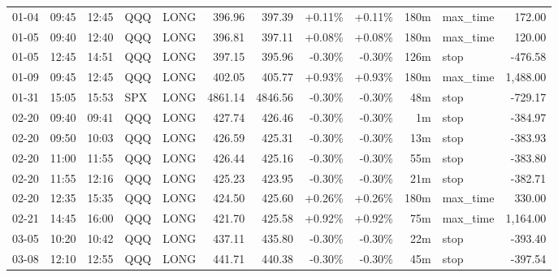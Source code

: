\documentclass[11pt,a4paper]{article}
\begin{document}
\begin{center}
\begin{longtable}{>{\color{txtmain}}l l l l l r r r r r >{\color{txtmain}}l r}
01-04 & 09:45 & 12:45 & QQQ & LONG & 396.96 & 397.39 & \textcolor{wingreen}{+0.11\%} & \textcolor{wingreen}{+0.11\%} & 180m & max\_time & \textcolor{wingreen}{172.00} \\
01-05 & 09:40 & 12:40 & QQQ & LONG & 396.81 & 397.11 & \textcolor{wingreen}{+0.08\%} & \textcolor{wingreen}{+0.08\%} & 180m & max\_time & \textcolor{wingreen}{120.00} \\
01-05 & 12:45 & 14:51 & QQQ & LONG & 397.15 & 395.96 & \textcolor{lossred}{-0.30\%} & \textcolor{lossred}{-0.30\%} & 126m & stop & \textcolor{lossred}{-476.58} \\
01-09 & 09:45 & 12:45 & QQQ & LONG & 402.05 & 405.77 & \textcolor{wingreen}{+0.93\%} & \textcolor{wingreen}{+0.93\%} & 180m & max\_time & \textcolor{wingreen}{1,488.00} \\
01-31 & 15:05 & 15:53 & SPX & LONG & 4861.14 & 4846.56 & \textcolor{lossred}{-0.30\%} & \textcolor{lossred}{-0.30\%} & 48m & stop & \textcolor{lossred}{-729.17} \\
02-20 & 09:40 & 09:41 & QQQ & LONG & 427.74 & 426.46 & \textcolor{lossred}{-0.30\%} & \textcolor{lossred}{-0.30\%} & 1m & stop & \textcolor{lossred}{-384.97} \\
02-20 & 09:50 & 10:03 & QQQ & LONG & 426.59 & 425.31 & \textcolor{lossred}{-0.30\%} & \textcolor{lossred}{-0.30\%} & 13m & stop & \textcolor{lossred}{-383.93} \\
02-20 & 11:00 & 11:55 & QQQ & LONG & 426.44 & 425.16 & \textcolor{lossred}{-0.30\%} & \textcolor{lossred}{-0.30\%} & 55m & stop & \textcolor{lossred}{-383.80} \\
02-20 & 11:55 & 12:16 & QQQ & LONG & 425.23 & 423.95 & \textcolor{lossred}{-0.30\%} & \textcolor{lossred}{-0.30\%} & 21m & stop & \textcolor{lossred}{-382.71} \\
02-20 & 12:35 & 15:35 & QQQ & LONG & 424.50 & 425.60 & \textcolor{wingreen}{+0.26\%} & \textcolor{wingreen}{+0.26\%} & 180m & max\_time & \textcolor{wingreen}{330.00} \\
02-21 & 14:45 & 16:00 & QQQ & LONG & 421.70 & 425.58 & \textcolor{wingreen}{+0.92\%} & \textcolor{wingreen}{+0.92\%} & 75m & max\_time & \textcolor{wingreen}{1,164.00} \\
03-05 & 10:20 & 10:42 & QQQ & LONG & 437.11 & 435.80 & \textcolor{lossred}{-0.30\%} & \textcolor{lossred}{-0.30\%} & 22m & stop & \textcolor{lossred}{-393.40} \\
03-08 & 12:10 & 12:55 & QQQ & LONG & 441.71 & 440.38 & \textcolor{lossred}{-0.30\%} & \textcolor{lossred}{-0.30\%} & 45m & stop & \textcolor{lossred}{-397.54} \\

\end{longtable}
\end{center}
\end{document}
